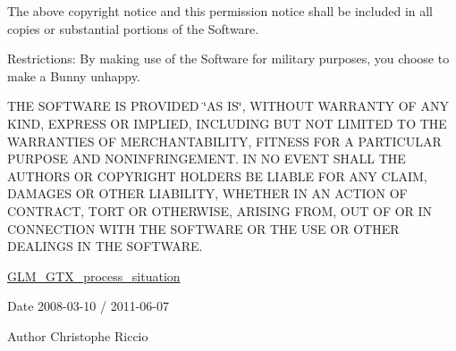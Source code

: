 The above copyright notice and this permission notice shall be included in all copies or substantial portions of the Software.

Restrictions\-: By making use of the Software for military purposes, you choose to make a Bunny unhappy.

T\-H\-E S\-O\-F\-T\-W\-A\-R\-E I\-S P\-R\-O\-V\-I\-D\-E\-D \char`\"{}\-A\-S I\-S\char`\"{}, W\-I\-T\-H\-O\-U\-T W\-A\-R\-R\-A\-N\-T\-Y O\-F A\-N\-Y K\-I\-N\-D, E\-X\-P\-R\-E\-S\-S O\-R I\-M\-P\-L\-I\-E\-D, I\-N\-C\-L\-U\-D\-I\-N\-G B\-U\-T N\-O\-T L\-I\-M\-I\-T\-E\-D T\-O T\-H\-E W\-A\-R\-R\-A\-N\-T\-I\-E\-S O\-F M\-E\-R\-C\-H\-A\-N\-T\-A\-B\-I\-L\-I\-T\-Y, F\-I\-T\-N\-E\-S\-S F\-O\-R A P\-A\-R\-T\-I\-C\-U\-L\-A\-R P\-U\-R\-P\-O\-S\-E A\-N\-D N\-O\-N\-I\-N\-F\-R\-I\-N\-G\-E\-M\-E\-N\-T. I\-N N\-O E\-V\-E\-N\-T S\-H\-A\-L\-L T\-H\-E A\-U\-T\-H\-O\-R\-S O\-R C\-O\-P\-Y\-R\-I\-G\-H\-T H\-O\-L\-D\-E\-R\-S B\-E L\-I\-A\-B\-L\-E F\-O\-R A\-N\-Y C\-L\-A\-I\-M, D\-A\-M\-A\-G\-E\-S O\-R O\-T\-H\-E\-R L\-I\-A\-B\-I\-L\-I\-T\-Y, W\-H\-E\-T\-H\-E\-R I\-N A\-N A\-C\-T\-I\-O\-N O\-F C\-O\-N\-T\-R\-A\-C\-T, T\-O\-R\-T O\-R O\-T\-H\-E\-R\-W\-I\-S\-E, A\-R\-I\-S\-I\-N\-G F\-R\-O\-M, O\-U\-T O\-F O\-R I\-N C\-O\-N\-N\-E\-C\-T\-I\-O\-N W\-I\-T\-H T\-H\-E S\-O\-F\-T\-W\-A\-R\-E O\-R T\-H\-E U\-S\-E O\-R O\-T\-H\-E\-R D\-E\-A\-L\-I\-N\-G\-S I\-N T\-H\-E S\-O\-F\-T\-W\-A\-R\-E.

\hyperlink{group__gtx__process__situation}{G\-L\-M\-\_\-\-G\-T\-X\-\_\-process\-\_\-situation}

\begin{DoxyDate}{Date}
2008-\/03-\/10 / 2011-\/06-\/07 
\end{DoxyDate}
\begin{DoxyAuthor}{Author}
Christophe Riccio 
\end{DoxyAuthor}
